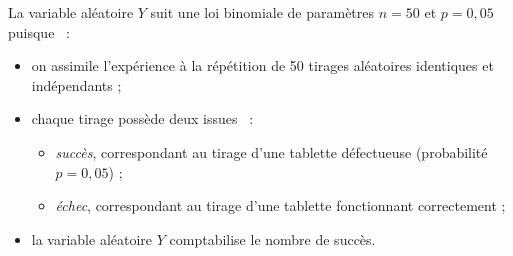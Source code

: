 \begin{corrige}
\begin{enumerate}
          \par
          La variable aléatoire $Y$ suit une loi binomiale de paramètres $n=50$ et $p=0,05$ puisque ~:
          \par
          \begin{itemize}
               \par
               \item on assimile l'expérience à la répétition de 50 tirages aléatoires identiques et indépendants ;
               \par
               \item chaque tirage possède deux issues ~:
               \par
               \begin{itemize}
                    \par
                    \item \textit{succès}, correspondant au tirage d'une tablette défectueuse (probabilité $p=0,05$) ;
                    \item \textit{échec}, correspondant au tirage d'une tablette fonctionnant correctement ;
                    \par
               \end{itemize}
               \par
               \item la variable aléatoire $Y$ comptabilise le nombre de succès.
               \par
          \end{itemize}
          \par
\end{enumerate}
\end{corrige}
